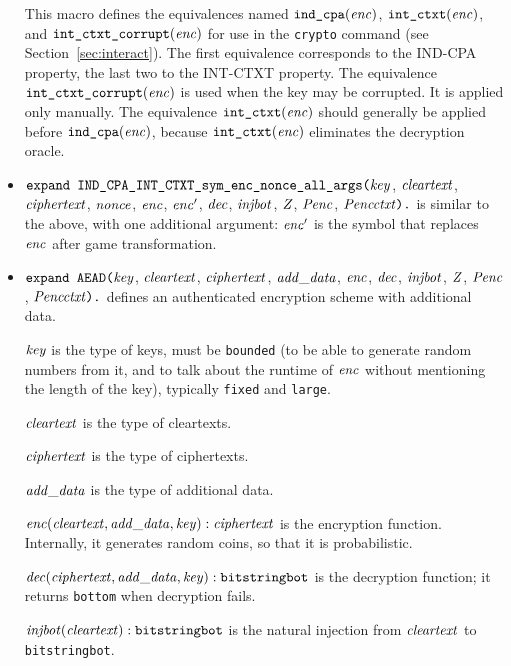 \documentclass{article}
\begin{document}
\begin{itemize}
   This macro defines the equivalences named $\texttt{ind\_cpa}(\mathit{enc})$,
   $\texttt{int\_ctxt}(\mathit{enc})$, and $\texttt{int\_ctxt\_corrupt}(\mathit{enc})$ 
   for use in the \texttt{crypto} command 
   (see Section~\ref{sec:interact}). 
   The first equivalence corresponds to the
   IND-CPA property, the last two to the INT-CTXT property.
   The equivalence $\texttt{int\_ctxt\_corrupt}(\mathit{enc})$ is used when the
   key may be corrupted. It is applied only manually.
   The equivalence $\texttt{int\_ctxt}(\mathit{enc})$
   should generally be applied before $\texttt{ind\_cpa}(\mathit{enc})$,
   because $\texttt{int\_ctxt}(\mathit{enc})$ eliminates the decryption oracle.

\item $\texttt{expand IND\_CPA\_INT\_CTXT\_sym\_enc\_nonce\_all\_args(}\mathit{key}$,
$  \mathit{cleartext}$, $\mathit{ciphertext}$, $\mathit{nonce}$, $\mathit{enc}$, $\mathit{enc}'$,
$  \mathit{dec}$, $\mathit{injbot}$, $\mathit{Z}$, $\mathit{Penc}$, $\mathit{Pencctxt}\texttt{).}$  is similar to the above,
  with one additional argument: $\mathit{enc}'$ is the symbol that replaces $\mathit{enc}$ after game transformation.

\item $\texttt{expand AEAD(}\mathit{key}$,
$  \mathit{cleartext}$, $\mathit{ciphertext}$, $\mathit{add\_data}$, $\mathit{enc}$,
$  \mathit{dec}$, $\mathit{injbot}$, $\mathit{Z}$, $\mathit{Penc}$, $\mathit{Pencctxt}\texttt{).}$ defines an
authenticated encryption scheme with additional data.

   $\mathit{key}$ is the type of keys, must be \texttt{bounded} (to be able to generate random numbers from it, and to talk about the runtime of $\mathit{enc}$ without mentioning the length of the key), typically \texttt{fixed} and \texttt{large}.

   $\mathit{cleartext}$ is the type of cleartexts.

   $\mathit{ciphertext}$ is the type of ciphertexts.

   $\mathit{add\_data}$ is the type of additional data.

   $\mathit{enc}(\mathit{cleartext}, \mathit{add\_data}, \mathit{key}): \mathit{ciphertext}$ is the encryption function. Internally, it generates random coins, so that it is probabilistic.

   $\mathit{dec}(\mathit{ciphertext}, \mathit{add\_data}, \mathit{key}): \texttt{bitstringbot}$ is the
  decryption function; it returns \texttt{bottom} when decryption
  fails.

   $\mathit{injbot}(\mathit{cleartext}): \texttt{bitstringbot}$ is the natural
  injection from $\mathit{cleartext}$ to \texttt{bitstringbot}.


\end{itemize}
\end{document}
